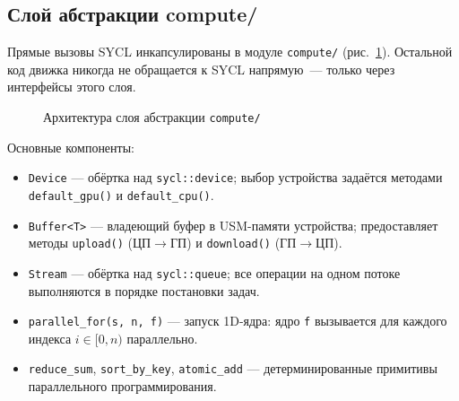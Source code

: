 \subsection{Слой абстракции compute/}

Прямые вызовы SYCL инкапсулированы в модуле \texttt{compute/} (рис.~\ref{fig:compute_arch}). Остальной код 
движка никогда не обращается к SYCL напрямую~--- только через интерфейсы этого слоя.

\begin{figure}[h]
\centering
{}
\caption{Архитектура слоя абстракции \texttt{compute/}}
\label{fig:compute_arch}
\end{figure}

Основные компоненты:
\begin{itemize}
  \item \texttt{Device} --- обёртка над \texttt{sycl::device};
    выбор устройства задаётся методами \texttt{default\_\allowbreak gpu()} и \texttt{default\_\allowbreak cpu()}.
  \item \texttt{Buffer<T>} --- владеющий буфер в USM-памяти устройства;
    предоставляет методы \texttt{upload()} (ЦП$\to$ГП) и \texttt{download()} (ГП$\to$ЦП).
  \item \texttt{Stream} --- обёртка над \texttt{sycl::queue};
    все операции на одном потоке выполняются в порядке постановки задач.
  \item \texttt{parallel\_for(s,\,n,\,f)} --- запуск 1D-ядра: ядро \texttt{f} вызывается
    для каждого индекса $i \in [0, n)$ параллельно.
  \item \texttt{reduce\_sum}, \texttt{sort\_by\_key}, \texttt{atomic\_add} ---
    детерминированные примитивы параллельного программирования.
\end{itemize}


